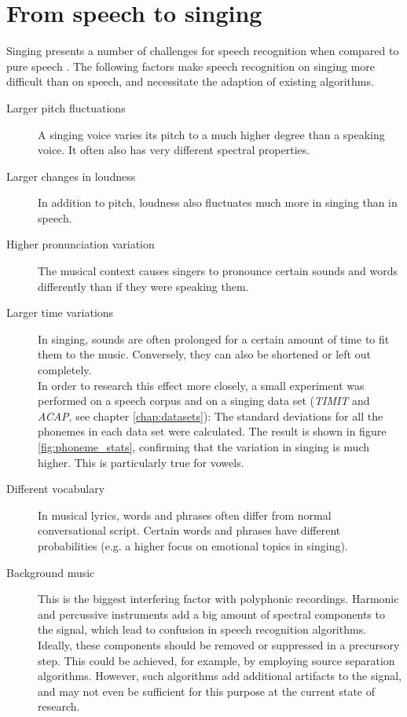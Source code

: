 \section{From speech to singing} \label{sec:sota_speechtosinging}
Singing presents a number of challenges for speech recognition when compared to pure speech \cite{loscos}\cite{goto_alignment}\cite{kruspe_kws1}. The following factors make speech recognition on singing more difficult than on speech, and necessitate the adaption of existing algorithms.
\begin{description}
 \item[Larger pitch fluctuations] A singing voice varies its pitch to a much higher degree than a speaking voice. It often also has very different spectral properties.
 \item[Larger changes in loudness] In addition to pitch, loudness also fluctuates much more in singing than in speech.
 \item[Higher pronunciation variation] The musical context causes singers to pronounce certain sounds and words differently than if they were speaking them.
 \item[Larger time variations] In singing, sounds are often prolonged for a certain amount of time to fit them to the music. Conversely, they can also be shortened or left out completely.\\
 In order to research this effect more closely, a small experiment was performed on a speech corpus and on a singing data set (\textit{TIMIT} and \textit{ACAP}, see chapter \ref{chap:datasets}): The standard deviations for all the phonemes in each data set were calculated. The result is shown in figure \ref{fig:phoneme_stats}, confirming that the variation in singing is much higher. This is particularly true for vowels.
 \item[Different vocabulary] In musical lyrics, words and phrases often differ from normal conversational script. Certain words and phrases have different probabilities (e.g. a higher focus on emotional topics in singing).
 \item[Background music] This is the biggest interfering factor with polyphonic recordings. Harmonic and percussive instruments add a big amount of spectral components to the signal, which lead to confusion in speech recognition algorithms. Ideally, these components should be removed or suppressed in a precursory step. This could be achieved, for example, by employing source separation algorithms. However, such algorithms add additional artifacts to the signal, and may not even be sufficient for this purpose at the current state of research.\\

\end{description}
